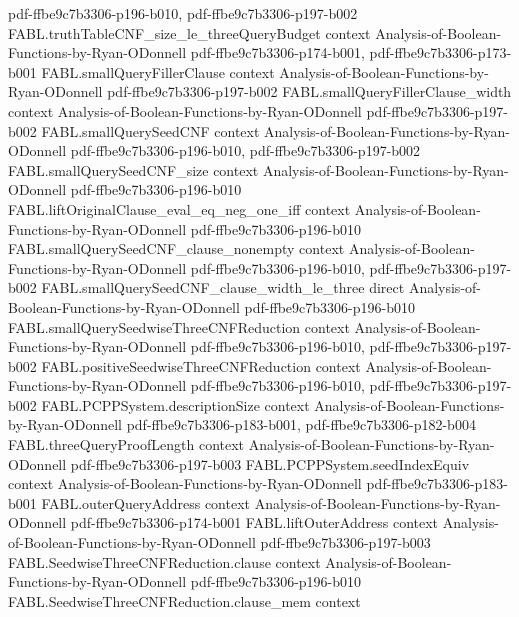 \begin{theorem}
  {pdf-ffbe9c7b3306-p196-b010,
    pdf-ffbe9c7b3306-p197-b002}
\proofstep
  {FABL.truthTableCNF_size_le_threeQueryBudget}
  {context}
  {Analysis-of-Boolean-Functions-by-Ryan-ODonnell}
  {pdf-ffbe9c7b3306-p174-b001,
    pdf-ffbe9c7b3306-p173-b001}
\proofstep
  {FABL.smallQueryFillerClause}
  {context}
  {Analysis-of-Boolean-Functions-by-Ryan-ODonnell}
  {pdf-ffbe9c7b3306-p197-b002}
\proofstep
  {FABL.smallQueryFillerClause_width}
  {context}
  {Analysis-of-Boolean-Functions-by-Ryan-ODonnell}
  {pdf-ffbe9c7b3306-p197-b002}
\proofstep
  {FABL.smallQuerySeedCNF}
  {context}
  {Analysis-of-Boolean-Functions-by-Ryan-ODonnell}
  {pdf-ffbe9c7b3306-p196-b010,
    pdf-ffbe9c7b3306-p197-b002}
\proofstep
  {FABL.smallQuerySeedCNF_size}
  {context}
  {Analysis-of-Boolean-Functions-by-Ryan-ODonnell}
  {pdf-ffbe9c7b3306-p196-b010}
\proofstep
  {FABL.liftOriginalClause_eval_eq_neg_one_iff}
  {context}
  {Analysis-of-Boolean-Functions-by-Ryan-ODonnell}
  {pdf-ffbe9c7b3306-p196-b010}
\proofstep
  {FABL.smallQuerySeedCNF_clause_nonempty}
  {context}
  {Analysis-of-Boolean-Functions-by-Ryan-ODonnell}
  {pdf-ffbe9c7b3306-p196-b010,
    pdf-ffbe9c7b3306-p197-b002}
\proofstep
  {FABL.smallQuerySeedCNF_clause_width_le_three}
  {direct}
  {Analysis-of-Boolean-Functions-by-Ryan-ODonnell}
  {pdf-ffbe9c7b3306-p196-b010}
\proofstep
  {FABL.smallQuerySeedwiseThreeCNFReduction}
  {context}
  {Analysis-of-Boolean-Functions-by-Ryan-ODonnell}
  {pdf-ffbe9c7b3306-p196-b010,
    pdf-ffbe9c7b3306-p197-b002}
\proofstep
  {FABL.positiveSeedwiseThreeCNFReduction}
  {context}
  {Analysis-of-Boolean-Functions-by-Ryan-ODonnell}
  {pdf-ffbe9c7b3306-p196-b010,
    pdf-ffbe9c7b3306-p197-b002}
\proofstep
  {FABL.PCPPSystem.descriptionSize}
  {context}
  {Analysis-of-Boolean-Functions-by-Ryan-ODonnell}
  {pdf-ffbe9c7b3306-p183-b001,
    pdf-ffbe9c7b3306-p182-b004}
\proofstep
  {FABL.threeQueryProofLength}
  {context}
  {Analysis-of-Boolean-Functions-by-Ryan-ODonnell}
  {pdf-ffbe9c7b3306-p197-b003}
\proofstep
  {FABL.PCPPSystem.seedIndexEquiv}
  {context}
  {Analysis-of-Boolean-Functions-by-Ryan-ODonnell}
  {pdf-ffbe9c7b3306-p183-b001}
\proofstep
  {FABL.outerQueryAddress}
  {context}
  {Analysis-of-Boolean-Functions-by-Ryan-ODonnell}
  {pdf-ffbe9c7b3306-p174-b001}
\proofstep
  {FABL.liftOuterAddress}
  {context}
  {Analysis-of-Boolean-Functions-by-Ryan-ODonnell}
  {pdf-ffbe9c7b3306-p197-b003}
\proofstep
  {FABL.SeedwiseThreeCNFReduction.clause}
  {context}
  {Analysis-of-Boolean-Functions-by-Ryan-ODonnell}
  {pdf-ffbe9c7b3306-p196-b010}
\proofstep
  {FABL.SeedwiseThreeCNFReduction.clause_mem}
  {context}

\end{theorem}
